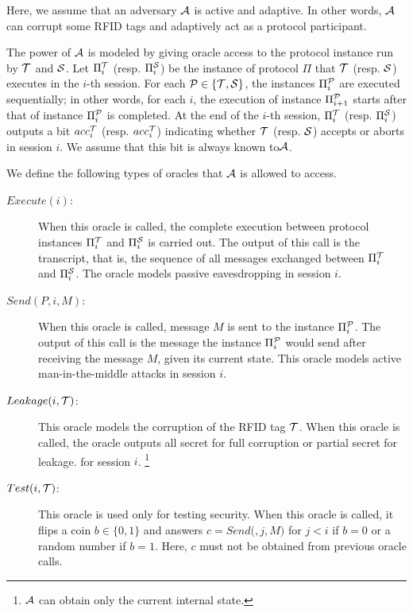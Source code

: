 \documentclass[english]{llncs}
\begin{document}
Here, we assume that an adversary ${\cal {A}}$ is active and adaptive.
In other words, ${\cal {A}}$ can corrupt some RFID tags and adaptively
act as a protocol participant.

The power of ${\cal {A}}$ is modeled by giving oracle access to the
protocol instance run by ${\cal {T}}$ and ${\cal {S}}$. Let $\Pi_{i}^{{\cal {T}}}$
(resp. $\Pi_{i}^{{\cal {S}}}$) be the instance of protocol $\Pi$
that ${\cal {T}}$ (resp. ${\cal {S}}$) executes in the $i$-th session.
For each ${\cal {P}\in\{{\cal {T},{\cal {S}\}}}}$, the instances
$\Pi_{i}^{{\cal {P}}}$ are executed sequentially; in other words,
for each $i$, the execution of instance $\Pi_{i+1}^{{\cal {P}}}$
starts after that of instance $\Pi_{i}^{{\cal {P}}}$ is completed.
At the end of the $i$-th session, $\Pi_{i}^{{\cal {T}}}$ (resp.
$\Pi_{i}^{{\cal {S}}}$) outputs a bit $acc_{i}^{{\cal T}}$ (resp.
$acc_{i}^{{\cal T}}$) indicating whether ${\cal {T}}$ (resp. ${\cal {S}}$)
accepts or aborts in session $i$. We assume that this bit is always
known to${\cal {A}}$.

We define the following types of oracles that ${\cal {A}}$ is allowed
to access.
\begin{description}
\item [{$Execute(i)$:}] When this oracle is called, the complete execution
between protocol instances $\Pi_{i}^{{\cal {T}}}$ and $\Pi_{i}^{{\cal {S}}}$
is carried out. The output of this call is the transcript, that is,
the sequence of all messages exchanged between $\Pi_{i}^{{\cal {T}}}$
and $\Pi_{i}^{{\cal {S}}}$. The oracle models passive eavesdropping
in session $i$.
\item [{$Send(P,i,M)$:}] When this oracle is called, message $M$ is sent
to the instance $\Pi_{i}^{{\cal {P}}}$. The output of this call is
the message the instance $\Pi_{i}^{{\cal {P}}}$ would send after
receiving the message $M$, given its current state. This oracle models
active man-in-the-middle attacks in session $i$.
\item [{$Leakage(i,{\cal {T})}$:}] This oracle models the corruption of
the RFID tag ${\cal {T}}$. When this oracle is called, the oracle
outputs 
all secret for full corruption or partial secret for leakage.
for session $i$.%
\footnote{${\cal {A}}$ can obtain only the current internal state.%
}
\item [{$Test(i,{\cal {T})}$:}] This oracle is used only for testing security.
When this oracle is called, it flips a coin $b\in\{0,1\}$ and answers
$c=Send($$,j,M)$ for $j<i$ if $b=0$ or a random number
if $b=1$. Here, $c$ must not be obtained from previous oracle calls. 
\end{description}
\end{document}
